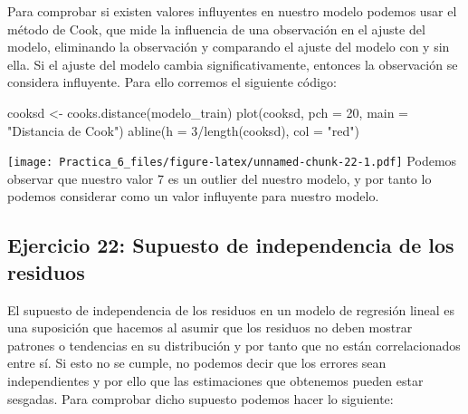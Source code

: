 \documentclass[
]{article}
\newenvironment{Shaded}{\begin{snugshade}}{\end{snugshade}}
\newcommand{\AttributeTok}[1]{\textcolor[rgb]{0.77,0.63,0.00}{#1}}
\newcommand{\DecValTok}[1]{\textcolor[rgb]{0.00,0.00,0.81}{#1}}
\newcommand{\FunctionTok}[1]{\textcolor[rgb]{0.00,0.00,0.00}{#1}}
\newcommand{\NormalTok}[1]{#1}
\newcommand{\OtherTok}[1]{\textcolor[rgb]{0.56,0.35,0.01}{#1}}
\newcommand{\SpecialCharTok}[1]{\textcolor[rgb]{0.00,0.00,0.00}{#1}}
\newcommand{\StringTok}[1]{\textcolor[rgb]{0.31,0.60,0.02}{#1}}
\begin{document}
Para comprobar si existen valores influyentes en nuestro modelo podemos
usar el método de Cook, que mide la influencia de una observación en el
ajuste del modelo, eliminando la observación y comparando el ajuste del
modelo con y sin ella. Si el ajuste del modelo cambia
significativamente, entonces la observación se considera influyente.
Para ello corremos el siguiente código:

\begin{Shaded}
\begin{Highlighting}[]
\NormalTok{cooksd }\OtherTok{\textless{}{-}} \FunctionTok{cooks.distance}\NormalTok{(modelo\_train)}
\FunctionTok{plot}\NormalTok{(cooksd, }\AttributeTok{pch =} \DecValTok{20}\NormalTok{, }\AttributeTok{main =} \StringTok{"Distancia de Cook"}\NormalTok{)}
\FunctionTok{abline}\NormalTok{(}\AttributeTok{h =} \DecValTok{3}\SpecialCharTok{/}\FunctionTok{length}\NormalTok{(cooksd), }\AttributeTok{col =} \StringTok{"red"}\NormalTok{)}
\end{Highlighting}
\end{Shaded}

\texttt{[image: Practica\_6\_files/figure-latex/unnamed-chunk-22-1.pdf]}
Podemos observar que nuestro valor 7 es un outlier del nuestro modelo, y
por tanto lo podemos considerar como un valor influyente para nuestro
modelo.

\hypertarget{ejercicio-22-supuesto-de-independencia-de-los-residuos}{%
\subsection{Ejercicio 22: Supuesto de independencia de los
residuos}\label{ejercicio-22-supuesto-de-independencia-de-los-residuos}}

El supuesto de independencia de los residuos en un modelo de regresión
lineal es una suposición que hacemos al asumir que los residuos no deben
mostrar patrones o tendencias en su distribución y por tanto que no
están correlacionados entre sí. Si esto no se cumple, no podemos decir
que los errores sean independientes y por ello que las estimaciones que
obtenemos pueden estar sesgadas. Para comprobar dicho supuesto podemos
hacer lo siguiente:

\begin{Shaded}
\end{Shaded}
\end{document}
